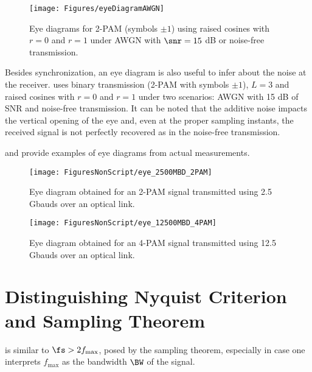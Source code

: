 \begin{figure}[htbp]
\centering
\texttt{[image: Figures/eyeDiagramAWGN]}
\caption{Eye diagrams for 2-PAM (symbols $\pm 1$) using raised cosines with $r=0$ and $r=1$ under AWGN with $\snr=15$ dB or noise-free transmission.\label{fig:eyeDiagramAWGN}}
\end{figure}

Besides synchronization, an eye diagram is also useful to infer about the noise at the receiver.
 uses binary transmission (2-PAM with symbols $\pm 1$), $L=3$ and raised cosines with $r=0$ and $r=1$ under two scenarios: AWGN with 15 dB of SNR and noise-free transmission. It can be noted that the additive noise impacts the vertical opening of the eye and, even at the proper sampling instants, the received signal is not perfectly recovered as in the noise-free transmission.

 and  provide examples of eye
diagrams from actual measurements.

\begin{figure}[htbp]
\centering
\texttt{[image: FiguresNonScript/eye\_2500MBD\_2PAM]}
\caption{Eye diagram obtained for an 2-PAM signal transmitted using 2.5 Gbauds over an optical link.\label{fig:eye_2500MBD_2PAM}}
\end{figure}

\begin{figure}[htbp]
\centering
\texttt{[image: FiguresNonScript/eye\_12500MBD\_4PAM]}
\caption{Eye diagram obtained for an 4-PAM signal transmitted using 12.5 Gbauds over an optical link.\label{fig:eye_12500MBD_4PAM}}
\end{figure}


\section{Distinguishing Nyquist Criterion and Sampling Theorem}

 is similar to $\fs > 2 f_{\textrm{max}}$, posed by the sampling theorem, especially in case one interprets $f_{\textrm{max}}$ as the bandwidth $\BW$ of the signal. 

